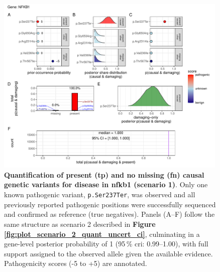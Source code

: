 \begin{figure}[ht]
  \centering
  \includegraphics[width=0.99\textwidth]{../images/plot_scenario_1_quant_uncert_ci.pdf}
  \caption{
 \textbf{Quantification of present (\ac{tp}) and no missing (\ac{fn}) causal genetic variants for disease in \ac{nfkb1} (scenario 1)}.
  Only one known pathogenic variant, \texttt{p.Ser237Ter}, was observed and all previously reported pathogenic positions were successfully sequenced and confirmed as reference (true negatives).  
  Panels (A–F) follow the same structure as scenario 2 described in \textbf{Figure \ref{fig:plot_scenario_2_quant_uncert_ci}}, culminating in a gene-level posterior probability of 1 (95\,\% \ac{cri}: 0.99–1.00), with full support assigned to the observed allele given the available evidence. Pathogenicity scores (-5 to +5) are annotated.
  }
  \label{fig:plot_scenario_1_quant_uncert_ci}
\end{figure}

